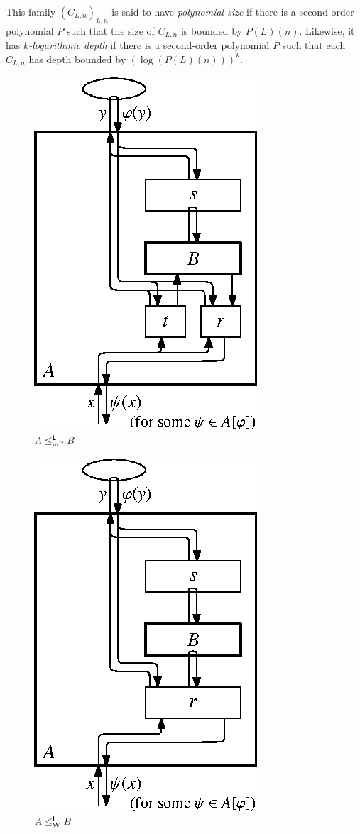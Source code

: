 \documentclass[envcountsect,envcountsame,orivec,oribibl]{llncs}
\newcommand{\classtwofont}[1]{\text{\bfseries \sffamily \upshape #1}}
\newcommand{\classLtwo}{\classtwofont{L}}
\newcommand{\redW}{\leq _{\mathrm W}}
\newcommand{\redmF}{\leq _{\mathrm{mF}}}
\newcommand{\redLW}{\redW ^{\classLtwo}}
\newcommand{\redLmF}{\redmF ^{\classLtwo}}
\begin{document}
This family $(C_{L,n})_{L,n}$ is said to have
\emph{polynomial size} 
if there is a second-order polynomial $P$ such that 
the size of $C _{L,n}$ is bounded by $P (L) (n)$. 
Likewise, it has \emph{$k$-logarithmic depth}
if there is a second-order polynomial $P$ such that 
each $C _{L,n}$ has depth bounded by $(\log (P(L)(n))) ^k$. 

\begin{figure}
\begin{center}
\hfill
\parbox[t]{150pt}{\centering\includegraphics[scale=0.9]{./redtwom.eps}\\[3pt]$A \redLmF B$}
\hfill
\parbox[t]{150pt}{\centering\includegraphics[scale=0.9]{./redtwoT.eps}\\[3pt]$A \redLW B$}

\end{center}
\end{figure}
\end{document}
